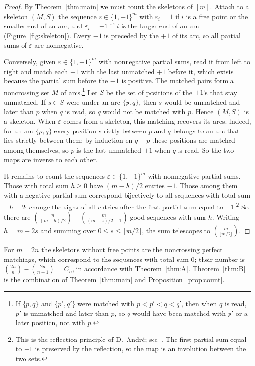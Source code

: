 \documentclass[11pt]{amsart}
\theoremstyle{definition}
\theoremstyle{remark}
\numberwithin{equation}{section}
\begin{document}
\begin{proof}
By Theorem~\ref{thm:main} we must count the skeletons of $[m]$. Attach to a skeleton $(M,S)$ the sequence $\varepsilon\in\{1,-1\}^m$ with $\varepsilon_i=1$ if $i$ is a free point or the smaller end of an arc, and $\varepsilon_i=-1$ if $i$ is the larger end of an arc (Figure~\ref{fig:skeleton}). Every $-1$ is preceded by the $+1$ of its arc, so all partial sums of $\varepsilon$ are nonnegative.

Conversely, given $\varepsilon\in\{1,-1\}^m$ with nonnegative partial sums, read it from left to right and match each $-1$ with the last unmatched $+1$ before it, which exists because the partial sum before the $-1$ is positive. The matched pairs form a noncrossing set $M$ of arcs.\footnote{If $\{p,q\}$ and $\{p',q'\}$ were matched with $p<p'<q<q'$, then when $q$ is read, $p'$ is unmatched and later than $p$, so $q$ would have been matched with $p'$ or a later position, not with $p$.} Let $S$ be the set of positions of the $+1$'s that stay unmatched. If $s\in S$ were under an arc $\{p,q\}$, then $s$ would be unmatched and later than $p$ when $q$ is read, so $q$ would not be matched with $p$. Hence $(M,S)$ is a skeleton. When $\varepsilon$ comes from a skeleton, this matching recovers its arcs. Indeed, for an arc $\{p,q\}$ every position strictly between $p$ and $q$ belongs to an arc that lies strictly between them; by induction on $q-p$ these positions are matched among themselves, so $p$ is the last unmatched $+1$ when $q$ is read. So the two maps are inverse to each other.

It remains to count the sequences $\varepsilon\in\{1,-1\}^m$ with nonnegative partial sums. Those with total sum $h\ge0$ have $(m-h)/2$ entries $-1$. Those among them with a negative partial sum correspond bijectively to all sequences with total sum $-h-2$: change the signs of all entries after the first partial sum equal to $-1$.\footnote{This is the reflection principle of D.~Andr\'e; see~\cite{Kr,De}. The first partial sum equal to $-1$ is preserved by the reflection, so the map is an involution between the two sets.} So there are $\binom{m}{(m-h)/2}-\binom{m}{(m-h)/2-1}$ good sequences with sum $h$. Writing $h=m-2s$ and summing over $0\le s\le\lfloor m/2\rfloor$, the sum telescopes to $\binom{m}{\lfloor m/2\rfloor}$.
\end{proof}

For $m=2n$ the skeletons without free points are the noncrossing perfect matchings, which correspond to the sequences with total sum $0$; their number is $\binom{2n}{n}-\binom{2n}{n-1}=C_n$, in accordance with Theorem~\ref{thm:A}. Theorem~\ref{thm:B} is the combination of Theorem~\ref{thm:main} and Proposition~\ref{prop:count}.
\end{document}
